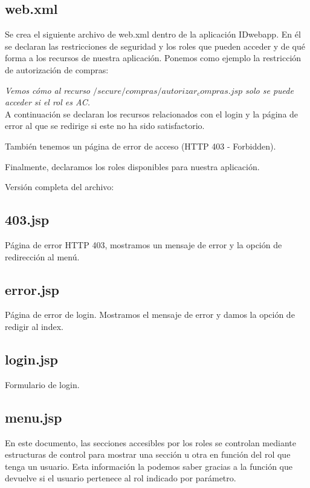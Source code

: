 \documentclass[10pt,a4paper]{article}
\begin{document}
\subsection*{web.xml}
Se crea el siguiente archivo de web.xml dentro de la aplicación IDwebapp. En él se declaran las restricciones de seguridad y los roles que pueden acceder y de qué forma a los recursos de nuestra aplicación. Ponemos como ejemplo la restricción de autorización de compras:


\textit{Vemos cómo al recurso $/secure/compras/autorizar_compras.jsp$ solo se puede acceder si el rol es AC.}\\

A continuación se declaran los recursos relacionados con el login y la página de error al que se redirige si este no ha sido satisfactorio.



También tenemos un página de error de acceso (HTTP 403 - Forbidden).



Finalmente, declaramos los roles disponibles para nuestra aplicación.



Versión completa del archivo:


\subsection*{403.jsp}
Página de error HTTP 403, mostramos un mensaje de error y la opción de redirección al menú.


\subsection*{error.jsp}
Página de error de login. Mostramos el mensaje de error y damos la opción de redigir al index.


\subsection*{login.jsp}
Formulario de login.


\subsection*{menu.jsp}
En este documento, las secciones accesibles por los roles se controlan mediante estructuras de control  para mostrar una sección u otra en función del rol que tenga un usuario. Esta información la podemos saber gracias a la función  que devuelve si el usuario pertenece al rol indicado por parámetro.
\end{document}
